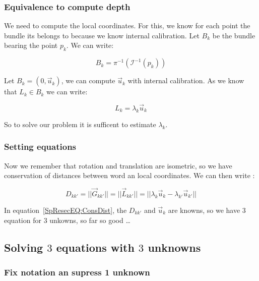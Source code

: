 \subsubsection{Equivalence to compute depth}

We need to compute the local coordinates. For this, we know for each point the bundle its belongs
to because we know internal calibration. Let $B_k$ be the bundle bearing the point $p_k$. We can write:


\begin{equation}
	B_k =  \pi^{-1} (\mathcal I ^{-1} (p_k)) \label{SpResecEQ:DefBundle}
\end{equation}



Let $B_k = (0,\Vec{u}_k)$,  we can compute $\Vec{u}_k$ with internal calibration.
As we know that $L_k \in B_k$ we can write:


\begin{equation}
	L_k = \lambda_k \Vec{u}_k \label{SpResecEQ:DefLambda}
\end{equation}

So to solve our problem it is sufficent to estimate $\lambda_k$.

\subsubsection{Setting equations}

Now we remember that rotation and translation are isometric, so we have conservation of
distances between  word an local coordinates. We can then write :


\begin{equation}
  D_{kk'}=||\Vec{G}_{kk'}||   = || \Vec{L}_{kk'} || = || \lambda_k \Vec{u}_k -  \lambda_{k'} \Vec{u}_{k'}|| \label{SpResecEQ:ConsDist}
\end{equation}


In equation~\ref{SpResecEQ:ConsDist}, the $D_{kk'}$ and  $\Vec{u}_k$ are knowns, so we have $3$ equation  for
$3$ unkowns, so far so good \dots 



\subsection{Solving $3$  equations with $3$ unknowns}

\subsubsection{Fix notation an supress 1 unknown}

